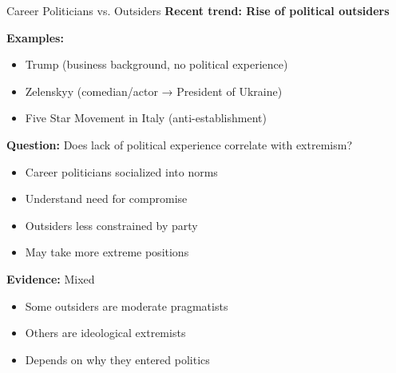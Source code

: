 \documentclass[10pt]{beamer}
\begin{document}
\begin{frame}{Career Politicians vs. Outsiders}
\textbf{Recent trend: Rise of political outsiders}



\textbf{Examples:}
\begin{itemize}
\item Trump (business background, no political experience)
\item Zelenskyy (comedian/actor → President of Ukraine)
\item Five Star Movement in Italy (anti-establishment)
\end{itemize}



\textbf{Question:} Does lack of political experience correlate with extremism?
\begin{itemize}
\item Career politicians socialized into norms
\item Understand need for compromise
\item Outsiders less constrained by party
\item May take more extreme positions
\end{itemize}



\textbf{Evidence:} Mixed
\begin{itemize}
\item Some outsiders are moderate pragmatists
\item Others are ideological extremists
\item Depends on why they entered politics
\end{itemize}
\end{frame}
\end{document}
